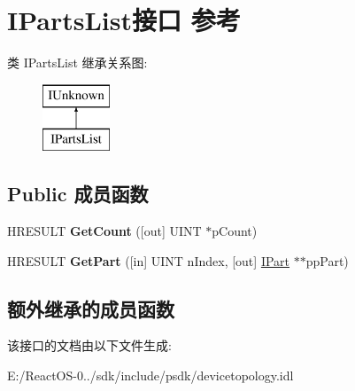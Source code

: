 \hypertarget{interface_i_parts_list}{}\section{I\+Parts\+List接口 参考}
\label{interface_i_parts_list}
类 I\+Parts\+List 继承关系图\+:\begin{figure}[H]
\begin{center}
\leavevmode
\includegraphics[height=2.000000cm]{interface_i_parts_list}
\end{center}
\end{figure}
\subsection*{Public 成员函数}
\begin{DoxyCompactItemize}
\item 
\mbox{\label{interface_i_parts_list_a06c128bef04e7c3d97800f0bae2aed03}} 
H\+R\+E\+S\+U\+LT {\bfseries Get\+Count} (\mbox{[}out\mbox{]} U\+I\+NT $\ast$p\+Count)
\item 
\mbox{\label{interface_i_parts_list_af1b42dad48a7d4640175b9d260a14aae}} 
H\+R\+E\+S\+U\+LT {\bfseries Get\+Part} (\mbox{[}in\mbox{]} U\+I\+NT n\+Index, \mbox{[}out\mbox{]} \hyperlink{interface_i_part}{I\+Part} $\ast$$\ast$pp\+Part)
\end{DoxyCompactItemize}
\subsection*{额外继承的成员函数}


该接口的文档由以下文件生成\+:\begin{DoxyCompactItemize}
\item 
E\+:/\+React\+O\+S-\/0../sdk/include/psdk/devicetopology.\+idl\end{DoxyCompactItemize}
